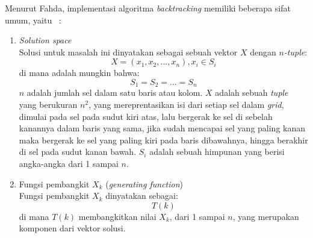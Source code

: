Menurut Fahda, implementasi algoritma \textit{backtracking} memiliki beberapa sifat umum, yaitu ~\cite{fahda:16:backtracking}:
\begin{enumerate}
\item \textit{Solution space}
\\ Solusi untuk masalah ini dinyatakan sebagai sebuah vektor \begin{math}X\end{math} dengan \textit{\begin{math}n\end{math}-tuple}:
\begin{displaymath}
X = (x_1, x_2, ..., x_n), x_i \in S_i
\end{displaymath}
di mana adalah mungkin bahwa:
\begin{displaymath}
S_1 = S_2 = ... = S_n
\end{displaymath} 
\begin{math}n\end{math} adalah jumlah sel dalam satu baris atau kolom. \begin{math}X\end{math} adalah sebuah \textit{tuple} yang berukuran \begin{math}n^2\end{math}, yang mereprentasikan isi dari setiap sel dalam \textit{grid}, dimulai pada sel pada sudut kiri atas, lalu bergerak ke sel di sebelah kanannya dalam baris yang sama, jika sudah mencapai sel yang paling kanan maka bergerak ke sel yang paling kiri pada baris dibawahnya, hingga berakhir di sel pada sudut kanan bawah. \begin{math}S_i\end{math} adalah sebuah himpunan yang berisi angka-angka dari 1 sampai \begin{math}n\end{math}.
\item Fungsi pembangkit \begin{math}X_k\end{math} (\textit{generating function})
\\ Fungsi pembangkit \begin{math}X_k\end{math} dinyatakan sebagai:
\begin{displaymath}
T(k)
\end{displaymath}
di mana \begin{math}T(k)\end{math} membangkitkan nilai \begin{math}X_k\end{math}, dari 1 sampai \begin{math}n\end{math}, yang merupakan komponen dari vektor solusi.

\end{enumerate}
